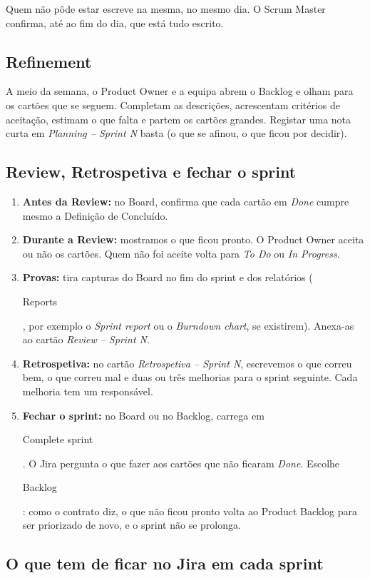\documentclass[11pt,a4paper]{article}
\newcommand{\btn}[1]{{\setlength{\fboxsep}{1.6pt}\colorbox{azulclaro}{\sffamily\small\strut #1}}}
\begin{document}
Quem não pôde estar escreve na mesma, no mesmo dia. O Scrum Master confirma, até ao fim do dia, que está tudo escrito.

\subsection{Refinement}

A meio da semana, o Product Owner e a equipa abrem o Backlog e olham para os cartões que se seguem. Completam as descrições, acrescentam critérios de aceitação, estimam o que falta e partem os cartões grandes. Registar uma nota curta em \textit{Planning – Sprint N} basta (o que se afinou, o que ficou por decidir).

\subsection{Review, Retrospetiva e fechar o sprint}

\begin{enumerate}
  \item \textbf{Antes da Review:} no Board, confirma que cada cartão em \textit{Done} cumpre mesmo a Definição de Concluído.
  \item \textbf{Durante a Review:} mostramos o que ficou pronto. O Product Owner aceita ou não os cartões. Quem não foi aceite volta para \textit{To Do} ou \textit{In Progress}.
  \item \textbf{Provas:} tira capturas do Board no fim do sprint e dos relatórios (\btn{Reports}, por exemplo o \textit{Sprint report} ou o \textit{Burndown chart}, se existirem). Anexa-as ao cartão \textit{Review – Sprint N}.
  \item \textbf{Retrospetiva:} no cartão \textit{Retrospetiva – Sprint N}, escrevemos o que correu bem, o que correu mal e duas ou três melhorias para o sprint seguinte. Cada melhoria tem um responsável.
  \item \textbf{Fechar o sprint:} no Board ou no Backlog, carrega em \btn{Complete sprint}. O Jira pergunta o que fazer aos cartões que não ficaram \textit{Done}. Escolhe \btn{Backlog}: como o contrato diz, o que não ficou pronto volta ao Product Backlog para ser priorizado de novo, e o sprint não se prolonga.
\end{enumerate}

\subsection{O que tem de ficar no Jira em cada sprint}
\end{document}
